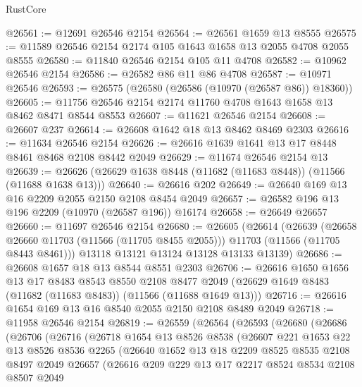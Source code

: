 \begin{lexlean}{RustCore}
\begin{coremodule}
@26561 := @12691 @26546 @2154
@26564 := @26561 @1659 @13 @8555
@26575 := @11589 @26546 @2154 @2174 @105 @1643 @1658 @13 @2055 @4708 @2055 @8555
@26580 := @11840 @26546 @2154 @105 @11 @4708
@26582 := @10962 @26546 @2154
@26586 := @26582 @86 @11 @86 @4708
@26587 := @10971 @26546
@26593 := @26575 (@26580 (@26586 (@10970 (@26587 @86)) @18360))
@26605 := @11756 @26546 @2154 @2174 @11760 @4708 @1643 @1658 @13 @8462 @8471 @8544 @8553
@26607 := @11621 @26546 @2154
@26608 := @26607 @237
@26614 := @26608 @1642 @18 @13 @8462 @8469 @2303
@26616 := @11634 @26546 @2154
@26626 := @26616 @1639 @1641 @13 @17 @8448 @8461 @8468 @2108 @8442 @2049
@26629 := @11674 @26546 @2154 @13
@26639 := @26626 (@26629 @1638 @8448 (@11682 (@11683 @8448)) (@11566 (@11688 @1638 @13)))
@26640 := @26616 @202
@26649 := @26640 @169 @13 @16 @2209 @2055 @2150 @2108 @8454 @2049
@26657 := @26582 @196 @13 @196 @2209 (@10970 (@26587 @196)) @16174
@26658 := @26649 @26657
@26660 := @11697 @26546 @2154
@26680 := @26605
    (@26614
      (@26639
        (@26658 @26660 @11703 (@11566 (@11705 @8455 @2055)))
        @11703
        (@11566 (@11705 @8443 @8461)))
      @13118
      @13121
      @13124
      @13128
      @13133
      @13139)
@26686 := @26608 @1657 @18 @13 @8544 @8551 @2303
@26706 := @26616
    @1650
    @1656
    @13
    @17
    @8483
    @8543
    @8550
    @2108
    @8477
    @2049
    (@26629 @1649 @8483 (@11682 (@11683 @8483)) (@11566 (@11688 @1649 @13)))
@26716 := @26616 @1654 @169 @13 @16 @8540 @2055 @2150 @2108 @8489 @2049
@26718 := @11958 @26546 @2154
@26819 := @26559
    (@26564
      (@26593
        (@26680
          (@26686
            (@26706
              (@26716
                (@26718
                  @1654
                  @13
                  @8526
                  @8538
                  (@26607
                    @221
                    @1653
                    @22
                    @13
                    @8526
                    @8536
                    @2265
                    (@26640
                      @1652
                      @13
                      @18
                      @2209
                      @8525
                      @8535
                      @2108
                      @8497
                      @2049
                      @26657
                      (@26616
                        @209
                        @229
                        @13
                        @17
                        @2217
                        @8524
                        @8534
                        @2108
                        @8507
                        @2049

\end{coremodule}
\end{lexlean}
